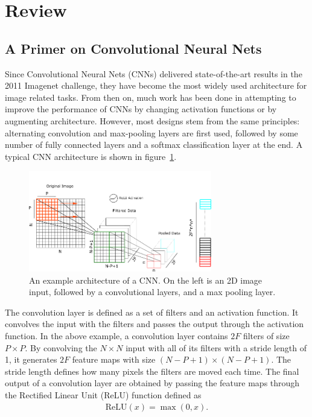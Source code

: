 \section{Review}
\subsection{A Primer on Convolutional Neural Nets}
Since Convolutional Neural Nets (CNNs) delivered state-of-the-art results in the 2011 Imagenet challenge, they have become the most widely used architecture for image related tasks. From then on, much work has been done in attempting to improve the performance of CNNs by changing activation functions or by augmenting architecture. However, most designs stem from the same principles: alternating convolution and max-pooling layers are first used, followed by some number of fully connected layers and a softmax classification layer at the end. A typical CNN architecture is shown in figure~\ref{fig:cnn}.

\begin{figure}[hb]
	\includegraphics[width = 8cm]{img/CNN.png}
    \caption{\label{fig:cnn}
    An example architecture of a CNN.
    On the left is an 2D image input, followed by a convolutional layers, and a 
    max pooling layer. }
\end{figure}

The convolution layer is defined as a set of filters and an activation function. It convolves the input with the filters and passes the output through the activation function. In the above example, a convolution layer contains $2F$ filters of size $P\times P$. By convolving the $N\times N$ input with all of its filters with a stride length of 1, it generates $2F$ feature maps with size $(N-P+1)\times (N-P+1)$. The stride length defines how many pixels the filters are moved each time. The final output of a convolution layer are obtained by passing the feature maps through the Rectified Linear Unit (ReLU) function defined as
\begin{align}
	\textrm{ReLU}(x) = \max(0,x).
\end{align}

